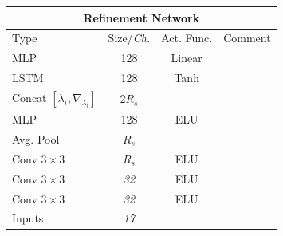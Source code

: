 \begin{center}
\begin{tabular}{lccl}
    \multicolumn{4}{c}{\textbf{Refinement Network}}\\
    \toprule
    Type & Size/\textit{Ch.} & Act. Func. & Comment\\ \midrule
    MLP & 128 & Linear & \\
    LSTM & 128 & Tanh & \\
    Concat $[{\lambda_i}, \nabla_{\lambda_i}]$ & $2R_s$ & & \\
    MLP & 128 & ELU & \\
    Avg. Pool & $R_s$ & \\
    Conv $3\times3$ & \textit{$R_s$}  & ELU & \\
    Conv $3\times3$ & \textit{32}  & ELU & \\
    Conv $3\times3$ & \textit{32}  & ELU & \\
    Inputs & \textit{17}  & & \\
    \bottomrule
\end{tabular}
\end{center}

